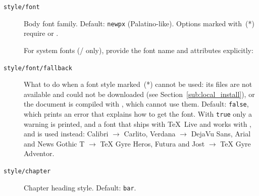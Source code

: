 \begin{description}
  \item[\texttt{style/font}] Body font family.  Default: \texttt{newpx}
    (Palatino-like).  Options marked with~(*) require  or .
\begin{latexcode}
\end{latexcode}

    For system fonts (/ only), provide the font name and
    attributes explicitly:
\begin{latexcode}
\end{latexcode}

  \item[\texttt{style/font/fallback}] What to do when a font style marked~(*) cannot be used: its files are not available and could not be downloaded (see Section~\ref{sub:local_install}), or the document is compiled with , which cannot use them.  Default: \texttt{false}, which prints an error that explains how to get the font.  With \texttt{true} only a warning is printed, and a font that ships with \TeX\ Live and works with ,  and  is used instead: Calibri $\to$ Carlito, Verdana $\to$ DejaVu Sans, Arial and News Gothic T $\to$ TeX Gyre Heros, Futura and Jost $\to$ TeX Gyre Adventor.
\begin{latexcode}
\end{latexcode}

  \item[\texttt{style/chapter}] Chapter heading style.  Default: \texttt{bar}.
\begin{latexcode}
\end{latexcode}


\end{description}
